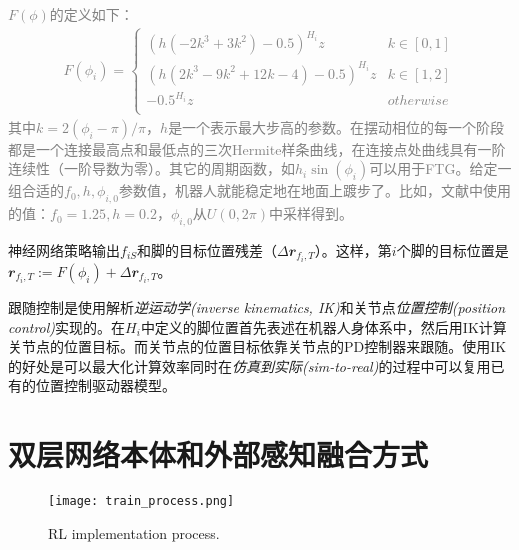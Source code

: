 \begin{note}
\noindent\textcolor{gray}{\small
$F(\phi)$的定义如下：
\begin{align}
    F(\phi_i)=\begin{cases}
        (h(-2k^3+3k^2)-0.5)^{H_i}z &k\in[0,1]\\
        (h(2k^3-9k^2+12k-4)-0.5)^{H_i}z &k\in[1,2]\\
        -0.5^{H_i}z & otherwise\\
    \end{cases}
\end{align}
其中$k=2(\phi_i-\pi)/\pi$，$h$是一个表示最大步高的参数。在摆动相位的每一个阶段都是一个连接最高点和最低点的三次Hermite样条曲线，在连接点处曲线具有一阶连续性（一阶导数为零）。其它的周期函数，如$h_i \sin (\phi_i)$可以用于FTG。给定一组合适的$f_0,h,\phi_{i,0}$参数值，机器人就能稳定地在地面上踱步了。比如，文献\cite[p7]{Lee_Hwangbo_Wellhausen_Koltun_Hutter_2020}中使用的值：$f_0=1.25,h=0.2$，$\phi_{i,0}$从$U(0,2\pi)$中采样得到。}
\end{note}

神经网络策略输出$f_{iS}$和脚的目标位置残差（$\Delta \mathbfit{r}_{f_i, T}$）。这样，第$i$个脚的目标位置是$\mathbfit{r}_{f_i, T}:=F(\phi_i)+\Delta \mathbfit{r}_{f_i, T}$。

跟随控制是使用解析\emph{逆运动学(inverse kinematics, IK)}和关节点\emph{位置控制(position control)}实现的。在$H_i$中定义的脚位置首先表述在机器人身体系中，然后用IK计算关节点的位置目标。而关节点的位置目标依靠关节点的PD控制器来跟随。使用IK的好处是可以最大化计算效率同时在\emph{仿真到实际(sim-to-real)}的过程中可以复用已有的位置控制驱动器模型\cite[p]{Lee_Hwangbo_Hutter_2019,Hwangbo_Bellicoso_Fankhauser_Huttery_2016}。

\section[双层网络本体和外部感知融合方式]{\label{section:rl_robust_in_wild}双层网络本体和外部感知融合方式\cite[p7]{Miki_Lee_Hwangbo_Wellhausen_Koltun_Hutter_2022}}


\begin{figure}
    \centering
    \texttt{[image: train\_process.png]}
    \caption{RL implementation process\cite[p9]{Miki_Lee_Hwangbo_Wellhausen_Koltun_Hutter_2022}.}
    \label{fig:process}
  \end{figure}
  
  
